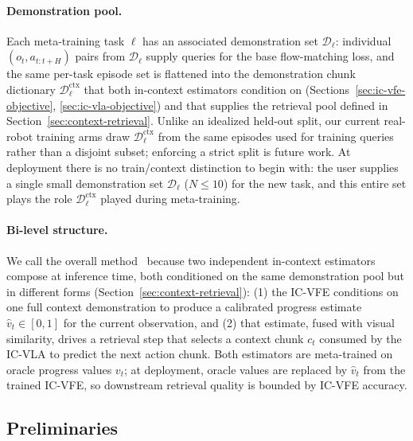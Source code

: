 \paragraph{Demonstration pool.} Each meta-training task $\ell$ has an associated
demonstration set $\mathcal{D}_\ell$: individual $(o_t, a_{t:t+H})$ pairs from
$\mathcal{D}_\ell$ supply queries for the base flow-matching loss, and the same
per-task episode set is flattened into the demonstration chunk dictionary
$\mathcal{D}_\ell^{\text{ctx}}$ that both in-context estimators condition on
(Sections~\ref{sec:ic-vfe-objective}, \ref{sec:ic-vla-objective}) and that supplies
the retrieval pool defined in Section~\ref{sec:context-retrieval}. Unlike an
idealized held-out split, our current real-robot training arms draw
$\mathcal{D}_\ell^{\text{ctx}}$ from the same episodes used for training queries
rather than a disjoint subset; enforcing a strict split is future work. At
deployment there is no train/context distinction to begin with: the user supplies
a single small demonstration set $\mathcal{D}_\ell$ ($N \le 10$) for the new task,
and this entire set plays the role $\mathcal{D}_\ell^{\text{ctx}}$ played during
meta-training.

\paragraph{Bi-level structure.} We call the overall method \method\ because two
independent in-context estimators compose at inference time, both conditioned on
the same demonstration pool but in different forms (Section~\ref{sec:context-retrieval}):
(1) the IC-VFE conditions on one full context demonstration to produce a calibrated
progress estimate $\hat{v}_t \in [0,1]$ for the current observation, and (2) that
estimate, fused with visual similarity, drives a retrieval step that selects a context
chunk $c_t$ consumed by the IC-VLA to predict the next action chunk. Both estimators
are meta-trained on oracle progress values $v_t$; at deployment, oracle values are
replaced by $\hat{v}_t$ from the trained IC-VFE, so downstream retrieval quality is
bounded by IC-VFE accuracy.

\subsection{Preliminaries}
\label{sec:preliminaries}

